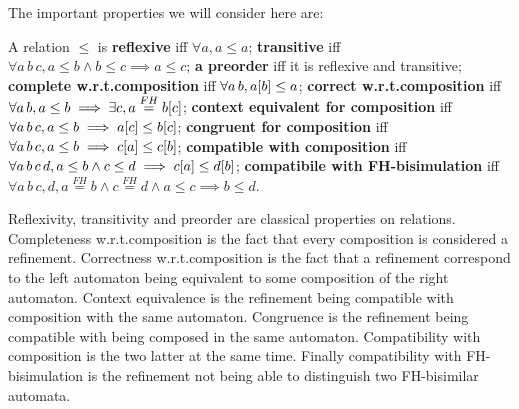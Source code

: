 \documentclass{article}
\begin{document}
The important properties we will consider here are:
\begin{defi} A relation \(\leq\) is
 \textbf{reflexive} iff \(\forall a, a \leq a\);
 \textbf{transitive} iff \(\forall a\, b\, c, a \leq b \wedge b \leq c \implies a \leq c\);
 \textbf{a preorder} iff it is reflexive and transitive;
 \textbf{complete w.r.t.\@ composition} iff \(\forall a\, b, a{\left[b\right]} \leq a\);
 \textbf{correct w.r.t.\@ composition} iff \(\forall a\, b, a \leq b \implies \exists c, a \overset{FH}= b{\left[c\right]}\);
 \textbf{context equivalent for composition} iff \(\forall a\, b\, c, a \leq b \implies a{\left[c\right]} \leq b{\left[c\right]}\);
 \textbf{congruent for composition} iff \(\forall a\, b\, c, a \leq b \implies c{\left[a\right]} \leq c{\left[b\right]}\);
 \textbf{compatible with composition} iff \(\forall a\, b\, c\, d, a \leq b \wedge c \leq d \implies c{\left[a\right]} \leq d{\left[b\right]}\);
 \textbf{compatibile with FH-bisimulation} iff \(\forall a\, b\, c, d, a \overset{FH}= b \wedge c \overset{FH}= d \wedge a \leq c \implies b \leq d\).
\end{defi}
Reflexivity, transitivity and preorder are classical properties on relations.
Completeness w.r.t.\@ composition is the fact that every composition is considered a refinement.
Correctness w.r.t.\@ composition is the fact that a refinement correspond to the left automaton being equivalent to some composition of the right automaton.
Context equivalence is the refinement being compatible with composition with the same automaton.
Congruence is the refinement being compatible with being composed in the same automaton.
Compatibility with composition is the two latter at the same time.
Finally compatibility with FH-bisimulation is the refinement not being able to distinguish two FH-bisimilar automata.
\end{document}
